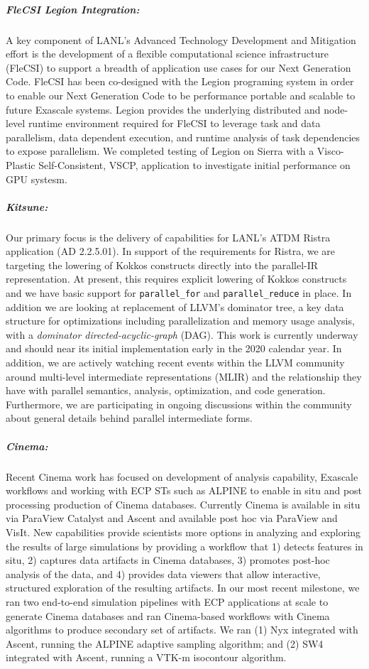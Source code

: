 \subparagraph{FleCSI Legion Integration:} 
A key component of LANL's Advanced Technology  Development and Mitigation effort is the development of a flexible computational science infrastructure (FleCSI) to support a breadth of application use cases for our Next Generation Code. FleCSI has been co-designed with the Legion programing system in order to enable our Next Generation Code to be performance portable and scalable to future Exascale systems. Legion provides the underlying distributed and node-level runtime environment required for FleCSI to leverage task and data parallelism, data dependent execution, and runtime analysis of task dependencies to expose parallelism. We completed testing of Legion on Sierra with a Visco-Plastic Self-Consistent, VSCP, application to investigate initial performance on GPU systesm.

\subparagraph{Kitsune:}
Our primary focus is the delivery of capabilities for LANL's ATDM
Ristra application (AD 2.2.5.01).  In support of the requirements for
Ristra, we are targeting the lowering of Kokkos constructs directly
into the parallel-IR representation.  At present, this requires
explicit lowering of Kokkos constructs and we have basic support
for \texttt{parallel\_for} and \texttt{parallel\_reduce} in place.  In
addition we are looking at replacement of LLVM's dominator tree, a key
data structure for optimizations including parallelization and
memory usage analysis, with a \emph{dominator directed-acyclic-graph}
(DAG).  This work is currently underway and should near its initial
implementation early in the 2020 calendar year.  In addition, we are
actively watching recent events within the LLVM community around
multi-level intermediate representations (MLIR) and the relationship
they have with parallel semantics, analysis, optimization, and code
generation.  Furthermore, we are participating in ongoing discussions within the
community about general details behind parallel intermediate forms. 



\subparagraph{Cinema:}

Recent Cinema work has focused on development of analysis capability, Exascale workflows and working with ECP STs such as ALPINE to enable in situ and post processing production of Cinema databases.  Currently Cinema is available in situ via ParaView Catalyst and Ascent and available post hoc via ParaView and VisIt.   New capabilities provide scientists more options in analyzing and exploring the results of large simulations by providing a workflow that 1) detects features in situ, 2) captures data artifacts in Cinema databases, 3) promotes post-hoc analysis of the data, and 4) provides data viewers that allow interactive, structured exploration of the resulting artifacts. 
%
In our most recent milestone, we ran two end-to-end simulation pipelines with ECP applications at scale to generate Cinema databases and ran Cinema-based workflows with Cinema algorithms to produce secondary set of artifacts.  We ran (1) Nyx integrated with Ascent, running the ALPINE adaptive sampling algorithm; and (2) SW4 integrated with Ascent, running a VTK-m isocontour algorithm.  


